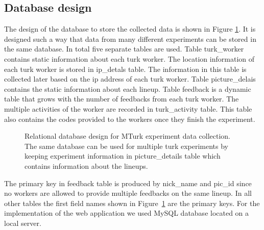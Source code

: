 \documentclass[11pt]{article}
\begin{document}
\subsection{Database design} The design of the database to store the collected data is shown in Figure \ref{fig:turk_database_design}. It is designed such a way that data from many different experiments can be stored in the same database. In total five separate tables are used. Table turk\_worker contains static information about each turk worker. The location information of each turk worker is stored in ip\_detals table. The information in this table is collected later based on the ip address of each turk worker. Table picture\_delais contains the static information about each lineup. Table feedback is a dynamic table that grows with the number of feedbacks from each turk worker. The multiple activities of the worker are recorded in turk\_activity table. This table also contains the codes provided to the workers once they finish the experiment. 

\begin{figure}[hbtp]
   \centering
       \caption{Relational database design for MTurk experiment data collection. The same database can be used for multiple turk experiments by keeping experiment information in picture\_details table which contains information about the lineups.}
       \label{fig:turk_database_design}
\end{figure}

The primary key in feedback table is produced by nick\_name and pic\_id since no workers are allowed to provide multiple feedbacks on the same lineup. In all other tables the first field names shown in Figure~\ref{fig:turk_database_design} are the primary keys. For the implementation of the web application we used MySQL database located on a local server.
\end{document}

